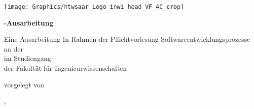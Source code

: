 \begin{titlepage}\linespread{1.5}\selectfont
\texttt{[image: Graphics/htwsaar\_Logo\_inwi\_head\_VF\_4C\_crop]}
  \begin{center}
    \large  
    \hfill
    \vfill
    \begingroup
      \Large\bfseries\mySubjectName-Ausarbeitung
    \endgroup
		\bigskip

		
    Eine Ausarbeitung In Rahmen der Pflichtvorlesung Softwareentwicklungsprozesse \\
    an der \myUni \\
    im Studiengang \myDegreeCourse \\
    der Fakultät für Ingenieurwissenschaften \\ 
    
  \vfill
	
  \begingroup
    \Large\bfseries\myTitle 
  \endgroup
	
	\bigskip
	
  vorgelegt von \\
  \myName
	
  \vfill
	
	
  \vfill
	
  \myLocation, \myTime                   

    \end{center}       
\end{titlepage}   